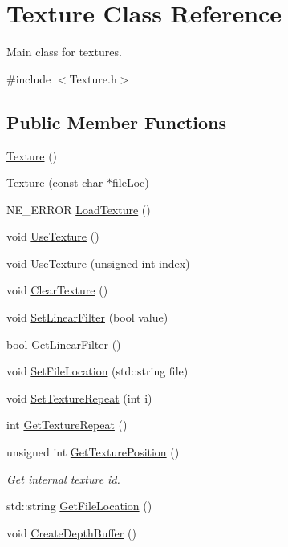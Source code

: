 \hypertarget{class_texture}{}\section{Texture Class Reference}
\label{class_texture}


Main class for textures.  




{\ttfamily \#include $<$Texture.\+h$>$}

\subsection*{Public Member Functions}
\begin{DoxyCompactItemize}
\item 
\mbox{\hyperlink{class_texture_a6c275e3f186675ff6ed73ccf970e552f}{Texture}} ()
\item 
\mbox{\hyperlink{class_texture_a8c924539fdb5f0813de81ce1c68df578}{Texture}} (const char $\ast$file\+Loc)
\item 
N\+E\+\_\+\+E\+R\+R\+OR \mbox{\hyperlink{class_texture_a9c888d7e8a19dc132fee9bd6eafd57cd}{Load\+Texture}} ()
\item 
void \mbox{\hyperlink{class_texture_a2cad441d204e64021515dffe8b0a5613}{Use\+Texture}} ()
\item 
void \mbox{\hyperlink{class_texture_a28f5689771fd3ef57234b809854ede42}{Use\+Texture}} (unsigned int index)
\item 
void \mbox{\hyperlink{class_texture_a8993ef7966161dd2e61e62a593bcdc80}{Clear\+Texture}} ()
\item 
void \mbox{\hyperlink{class_texture_a9a63163e104361b8ef653e5b28c9cf80}{Set\+Linear\+Filter}} (bool value)
\item 
bool \mbox{\hyperlink{class_texture_a40e37f9e62a3e17e5b8ffbf8d6a91d2e}{Get\+Linear\+Filter}} ()
\item 
void \mbox{\hyperlink{class_texture_a70791f39d7bef6d2db881873f53e8072}{Set\+File\+Location}} (std\+::string file)
\item 
void \mbox{\hyperlink{class_texture_ab6b96af013775496d5745a24175dd624}{Set\+Texture\+Repeat}} (int i)
\item 
int \mbox{\hyperlink{class_texture_a9e04e6e4775b9b920d574fd7cadee235}{Get\+Texture\+Repeat}} ()
\item 
unsigned int \mbox{\hyperlink{class_texture_a9127dfd2ef2fbaf9de3fb7c16bc6691c}{Get\+Texture\+Position}} ()
\begin{DoxyCompactList}\small\item\em Get internal texture id. \end{DoxyCompactList}\item 
std\+::string \mbox{\hyperlink{class_texture_a9956df46cb20493fa24bd9832a271e19}{Get\+File\+Location}} ()
\item 
void \mbox{\hyperlink{class_texture_a59cc35d4badabf3181f45a5005417ddd}{Create\+Depth\+Buffer}} ()
\end{DoxyCompactItemize}


